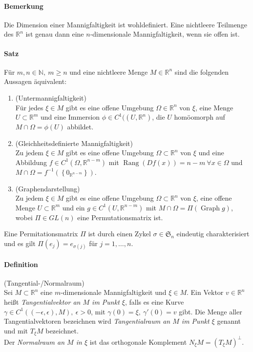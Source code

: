 \documentclass[12pt,a4paper,fleqn]{article}
\def\set#1{{\left\{ #1 \right\}}}
\def\R{{\mathbb{R}}}
\begin{document}
\paragraph{Bemerkung} Die Dimension einer Mannigfaltigkeit ist wohldefiniert. Eine nichtleere Teilmenge des $\R^n$ ist genau dann eine $n$-dimensionale Mannigfaltigkeit, wenn sie offen ist.

\paragraph{Satz} Für $m, n \in \mathbb{N},\ m \geq n$ und eine nichtleere Menge $M \in \R^n$ sind die folgenden Aussagen äquivalent:
\begin{enumerate}
\item (Untermannigfaltigkeit)\\
Für jedes $\xi \in M$ gibt es eine offene Umgebung $\Omega \in \R^n$ von $\xi$, eine Menge ${U \subset \R^m}$ und eine Immersion $\phi \in C^1((U, \R^n)$, die $U$ homöomorph auf ${M \cap \Omega = \phi(U)}$ abbildet.
\item (Gleichheitsdefinierte Mannigfaltigkeit)\\
Zu jedem $\xi \in M$ gibt es eine offene Umgebung $\Omega \subset \R^n$ von $\xi$ und eine Abbildung $f \in C^1(\Omega, \R^{n-m})$ mit $\operatorname{Rang} (Df(x)) = n - m \ \forall x \in \Omega$ und ${M\cap \Omega = f^{-1}(\set{0_{\R^{n-m}}})}$. 
\item (Graphendarstellung)\\
Zu jedem $\xi \in M$ gibt es eine offene Umgebung $\Omega \subset \R^n$ von $\xi$, eine offene Menge $U \subset \R^m$ und ein $g \in C^1(U, \R^{n-m})$ mit ${M\cap \Omega = \Pi(\operatorname{Graph} g)}$, wobei $\Pi \in GL(n)$ eine Permutationsmatrix ist.
\end{enumerate}
Eine  Permitationsmatrix $\Pi$ ist durch einen Zykel $\sigma \in \mathfrak{S}_n$ eindeutig charakterisiert und es gilt $\Pi (e_j) = e_{\sigma(j)}$ für $j = 1, \dotsc, n$.

\paragraph{Definition} (Tangential-/Normalraum)\\
Sei $M \subset \R^n$ eine $m$-dimensionale Mannigfaltigkeit und $\xi \in M$. Ein Vektor $v \in \R^n$ heißt \textit{Tangentialvektor an $M$ im Punkt $\xi$}, falls es eine Kurve $\gamma \in C^1((-\epsilon, \epsilon), M),\ {\epsilon > 0}$, mit $\gamma(0) = \xi,\ \gamma'(0) = v$ gibt.
Die Menge aller Tangentialvektoren bezeichnen wird \textit{Tangentialraum an $M$ im Punkt $\xi$} genannt und mit $T_\xi M$ bezeichnet.\\
Der \textit{Normalraum an $M$ in $\xi$} ist das orthogonale Komplement $N_\xi M = (T_\xi M)^\perp$.
\end{document}
